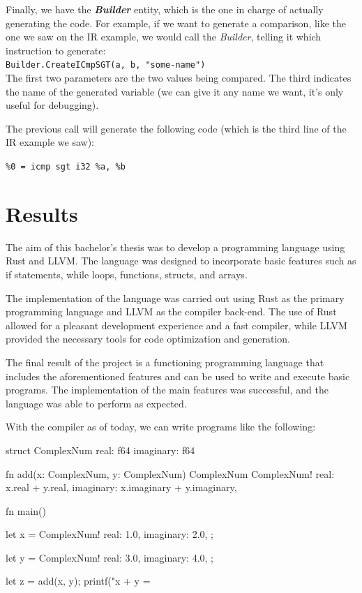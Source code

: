 ﻿\documentclass[10pt,a4paper,twocolumn,twoside]{article}
\begin{document}
Finally, we have the \textit{\textbf{Builder}} entity, which is the one in charge of 
actually generating the code. For example, if we want to generate a comparison,
like the one we saw on the IR example, we would call the \textit{Builder}, 
telling it which instruction to generate:\\

\texttt{Builder.CreateICmpSGT(a, b, "some-name")}
\\

The first two parameters are the two values being compared. The third 
indicates the name of the generated variable (we can give it any name we want,
it's only useful for debugging).

The previous call will generate the following code (which is the third line of
the IR example we saw):

\texttt{\%0 = icmp sgt i32 \%a, \%b}

\section{Results}
The aim of this bachelor's thesis was to develop a programming language using
Rust and LLVM. The language was designed to incorporate basic features such as
if statements, while loops, functions, structs, and arrays.

The implementation of the language was carried out using Rust as the primary
programming language and LLVM as the compiler back-end. The use of Rust
allowed for a pleasant development experience and a fast compiler, while LLVM 
provided the necessary tools for code optimization and generation.

The final result of the project is a functioning programming language that
includes the aforementioned features and can be used to write and execute basic
programs. The implementation of the main features was successful, and the
language was able to perform as expected.

With the compiler as of today, we can write programs like the following:

\begin{code}
struct ComplexNum {
    real:      f64
    imaginary: f64
}

fn add(x: ComplexNum, y: ComplexNum) ComplexNum {
    ComplexNum!{
        real: x.real + y.real,
        imaginary: x.imaginary + y.imaginary,
    }
}

fn main() {
    let x = ComplexNum!{
        real: 1.0,
        imaginary: 2.0,
    };

    let y = ComplexNum!{
        real: 3.0,
        imaginary: 4.0,
    };

    let z = add(x, y);
    printf("x + y = %
}
\end{code}
\end{document}
